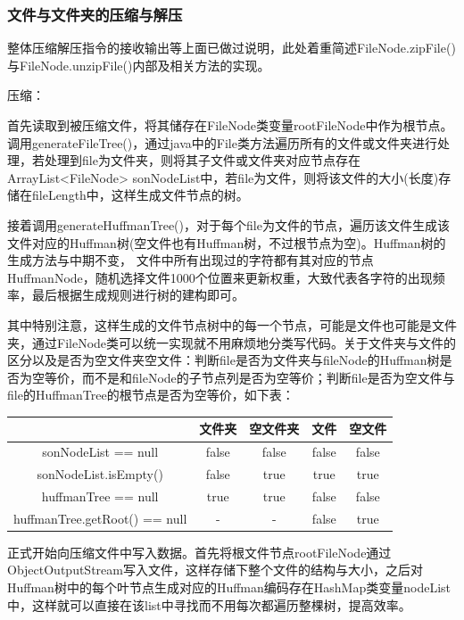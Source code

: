 \documentclass[11pt,a4paper]{article}
\begin{document}
\subsubsection*{文件与文件夹的压缩与解压}
\par{整体压缩解压指令的接收输出等上面已做过说明，此处着重简述FileNode.zipFile()与FileNode.unzipFile()内部及相关方法的实现。}
\par{压缩：}
\par{首先读取到被压缩文件，将其储存在FileNode类变量rootFileNode中作为根节点。调用generateFileTree()，通过java中的File类方法遍历所有的文件或文件夹进行处理，若处理到file为文件夹，则将其子文件或文件夹对应节点存在ArrayList<FileNode> sonNodeList中，若file为文件，则将该文件的大小(长度)存储在fileLength中，这样生成文件节点的树。}
\par{接着调用generateHuffmanTree()，对于每个file为文件的节点，遍历该文件生成该文件对应的Huffman树(空文件也有Huffman树，不过根节点为空)。Huffman树的生成方法与中期不变， 文件中所有出现过的字符都有其对应的节点HuffmanNode，随机选择文件1000个位置来更新权重，大致代表各字符的出现频率，最后根据生成规则进行树的建构即可。}
\par{其中特别注意，这样生成的文件节点树中的每一个节点，可能是文件也可能是文件夹，通过FileNode类可以统一实现就不用麻烦地分类写代码。关于文件夹与文件的区分以及是否为空文件夹空文件：判断file是否为文件夹与fileNode的Huffman树是否为空等价，而不是和fileNode的子节点列是否为空等价；判断file是否为空文件与file的HuffmanTree的根节点是否为空等价，如下表：}
\begin{table}[h!]
    \begin{center}
        \begin{tabular}{|c|c|c|c|c|}
            \hline
                                          & 文件夹 & 空文件夹 & 文件  & 空文件 \\
            \hline
            sonNodeList == null           & false  & false    & false & false  \\
            sonNodeList.isEmpty()         & false  & true     & true  & true   \\
            huffmanTree == null           & true   & true     & false & false  \\
            huffmanTree.getRoot() == null & -      & -        & false & true   \\
            \hline
        \end{tabular}
    \end{center}
\end{table}
\par{正式开始向压缩文件中写入数据。首先将根文件节点rootFileNode通过ObjectOutputStream写入文件，这样存储下整个文件的结构与大小，之后对Huffman树中的每个叶节点生成对应的Huffman编码存在HashMap类变量nodeList中，这样就可以直接在该list中寻找而不用每次都遍历整棵树，提高效率。}
\end{document}

